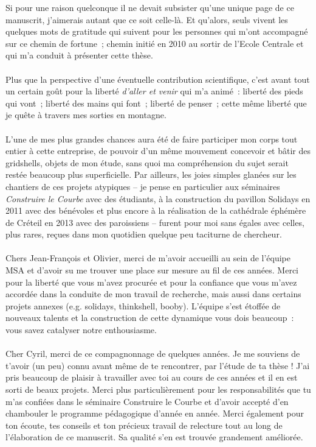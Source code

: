 Si pour une raison quelconque il ne devait subsister qu'une unique page de ce manuscrit, j'aimerais autant que ce soit celle-là. Et qu'alors, seuls vivent les quelques mots de gratitude qui suivent pour les personnes qui m'ont accompagné sur ce chemin de fortune~; chemin initié en 2010 au sortir de l'Ecole Centrale et qui m'a conduit à présenter cette thèse.
\\
\\
Plus que la perspective d'une éventuelle contribution scientifique, c'est avant tout un certain goût pour la liberté \emph{d'aller et venir} qui m'a animé~: liberté des pieds qui vont~; liberté des mains qui font~; liberté de penser~; cette même liberté que je quête à travers mes sorties en montagne.
\\
\\
L'une de mes plus grandes chances aura été de faire participer mon corps tout entier à cette entreprise, de pouvoir d'un même mouvement concevoir et bâtir des gridshells, objets de mon étude, sans quoi ma compréhension du sujet serait restée beaucoup plus superficielle. Par ailleurs, les joies simples glanées sur les chantiers de ces projets atypiques -- je pense en particulier aux séminaires \emph{Construire le Courbe} avec des étudiants, à la construction du pavillon Solidays en 2011 avec des bénévoles et plus encore à la réalisation de la cathédrale éphémère de Créteil en 2013 avec des paroissiens -- furent pour moi sans égales avec celles, plus rares, reçues dans mon quotidien quelque peu taciturne de chercheur.
\\
\\
Chers Jean-François et Olivier, merci de m'avoir accueilli au sein de l'équipe MSA et d'avoir su me trouver une place sur mesure au fil de ces années. Merci pour la liberté que vous m'avez procurée et pour la confiance que vous m'avez accordée dans la conduite de mon travail de recherche, mais aussi dans certains projets annexes (e.g. solidays, thinkshell, booby). L'équipe s'est étoffée de nouveaux talents et la construction de cette dynamique vous dois beaucoup~: vous savez catalyser notre enthousiasme.
\\
\\
Cher Cyril, merci de ce compagnonnage de quelques années. Je me souviens de t'avoir (un peu) connu avant même de te rencontrer, par l'étude de ta thèse ! J'ai pris beaucoup de plaisir à travailler avec toi au cours de ces années et il en est sorti de beaux projets. Merci plus particulièrement pour les responsabilités que tu m'as confiées dans le séminaire Construire le Courbe et d'avoir accepté d'en chambouler le programme pédagogique d'année en année. Merci également pour ton écoute, tes conseils et ton précieux travail de relecture tout au long de l'élaboration de ce manuscrit. Sa qualité s'en est trouvée grandement améliorée.

